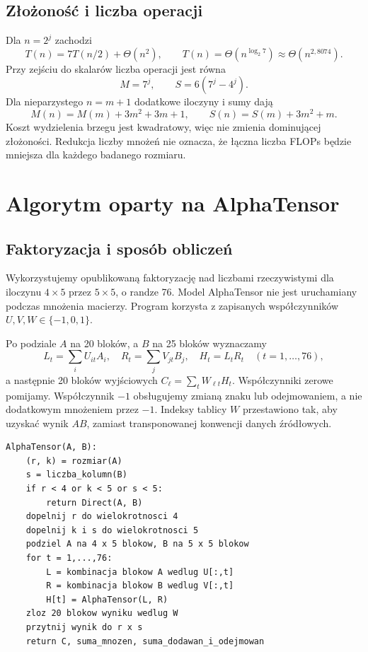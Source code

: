 \documentclass[11pt,a4paper]{article}
\begin{document}
\subsection{Złożoność i liczba operacji}
Dla $n=2^j$ zachodzi
\[
 T(n)=7T(n/2)+\Theta(n^2),\qquad
 T(n)=\Theta(n^{\log_2 7})\approx\Theta(n^{2{,}8074}).
\]
Przy zejściu do skalarów liczba operacji jest równa
\[
 M=7^j,\qquad S=6(7^j-4^j).
\]
Dla nieparzystego $n=m+1$ dodatkowe iloczyny i sumy dają
\[
 M(n)=M(m)+3m^2+3m+1,\qquad
 S(n)=S(m)+3m^2+m.
\]
Koszt wydzielenia brzegu jest kwadratowy, więc nie zmienia dominującej
złożoności. Redukcja liczby mnożeń nie oznacza, że łączna liczba FLOPs
będzie mniejsza dla każdego badanego rozmiaru.

\section{Algorytm oparty na AlphaTensor}
\subsection{Faktoryzacja i sposób obliczeń}
Wykorzystujemy opublikowaną faktoryzację nad liczbami rzeczywistymi
dla iloczynu $4\times5$ przez $5\times5$, o randze 76\cite{alphatensor,data}.
Model AlphaTensor nie jest uruchamiany podczas mnożenia macierzy.
Program korzysta z zapisanych współczynników $U,V,W\in\{-1,0,1\}$.

Po podziale $A$ na 20 bloków, a $B$ na 25 bloków wyznaczamy
\[
 L_t=\sum_i U_{it}A_i,\quad R_t=\sum_j V_{jt}B_j,\quad
 H_t=L_tR_t\quad(t=1,\ldots,76),
\]
a następnie 20 bloków wyjściowych
$C_\ell=\sum_t W_{\ell t}H_t$.
Współczynniki zerowe pomijamy. Współczynnik $-1$ obsługujemy zmianą
znaku lub odejmowaniem, a nie dodatkowym mnożeniem przez $-1$.
Indeksy tablicy $W$ przestawiono tak, aby uzyskać wynik $AB$,
zamiast transponowanej konwencji danych źródłowych.

\begin{lstlisting}[caption={Pseudokod rekurencyjnego AlphaTensor.}]
AlphaTensor(A, B):
    (r, k) = rozmiar(A)
    s = liczba_kolumn(B)
    if r < 4 or k < 5 or s < 5:
        return Direct(A, B)
    dopelnij r do wielokrotnosci 4
    dopelnij k i s do wielokrotnosci 5
    podziel A na 4 x 5 blokow, B na 5 x 5 blokow
    for t = 1,...,76:
        L = kombinacja blokow A wedlug U[:,t]
        R = kombinacja blokow B wedlug V[:,t]
        H[t] = AlphaTensor(L, R)
    zloz 20 blokow wyniku wedlug W
    przytnij wynik do r x s
    return C, suma_mnozen, suma_dodawan_i_odejmowan
\end{lstlisting}
\end{document}
